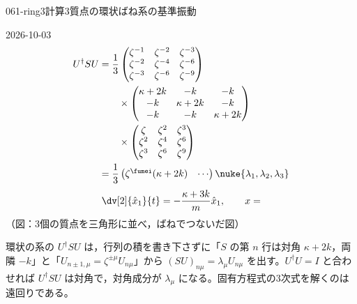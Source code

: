 \documentclass[uplatex,dvipdfmx,a4paper,11pt]{jsarticle}
\begin{document}
\begin{mondai}{061-ring3}{計算}{3質点の環状ばね系の基準振動}
\begin{kotaeutsushi}{2026-10-03}
\[\]
\begin{align*}
  U^{\dagger}SU&=\frac{1}{3}\begin{pmatrix}\zeta^{-1}&\zeta^{-2}&\zeta^{-3}\\\zeta^{-2}&\zeta^{-4}&\zeta^{-6}\\\zeta^{-3}&\zeta^{-6}&\zeta^{-9}\end{pmatrix}\\
  &\qquad\times\begin{pmatrix}\kappa+2k&-k&-k\\-k&\kappa+2k&-k\\-k&-k&\kappa+2k\end{pmatrix}\\
  &\qquad\times\begin{pmatrix}\zeta&\zeta^{2}&\zeta^{3}\\\zeta^{2}&\zeta^{4}&\zeta^{6}\\\zeta^{3}&\zeta^{6}&\zeta^{9}\end{pmatrix}\\
  &=\frac{1}{3}\begin{pmatrix}\zeta^{\fumei}(\kappa+2k)&\cdots\end{pmatrix}\nuke{\lambda_1,\lambda_2,\lambda_3}
\end{align*}
\[
  \dv[2]{\hat{x}_1}{t}=-\frac{\kappa+3k}{m}\hat{x}_1,\qquad x=
\]
（図：3個の質点を三角形に並べ，ばねでつないだ図）
\mikai
\end{kotaeutsushi}
\begin{kizuki}
\item 環状の系の $U^{\dagger}SU$ は，行列の積を書き下さずに「$S$ の第 $n$ 行は対角 $\kappa+2k$，両隣 $-k$」と「$U_{n\pm1,\mu}=\zeta^{\pm\mu}U_{n\mu}$」から $(SU)_{n\mu}=\lambda_{\mu}U_{n\mu}$ を出す。$U^{\dagger}U=I$ と合わせれば $U^{\dagger}SU$ は対角で，対角成分が $\lambda_{\mu}$ になる。固有方程式の3次式を解くのは遠回りである。

\end{kizuki}
\end{mondai}
\end{document}
